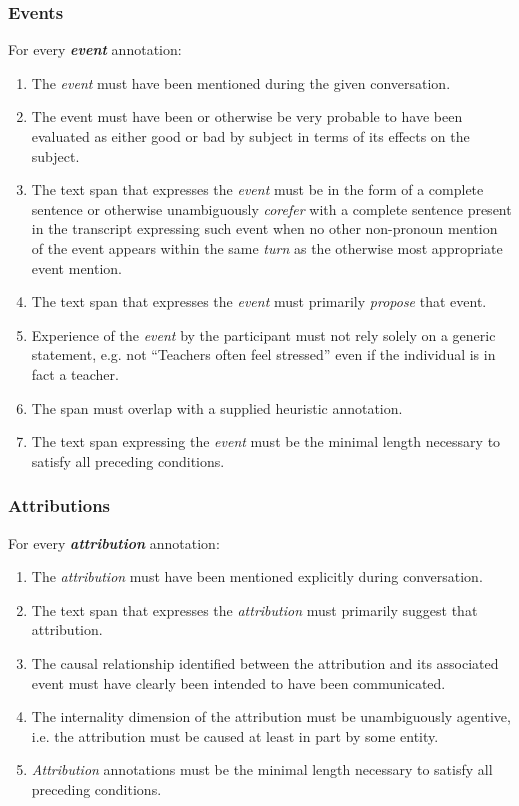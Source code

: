 \documentclass[a4paper,12pt]{article}
\begin{document}
    \subsubsection{Events}
    For every \textbf{\emph{event}} annotation:
        \begin{enumerate}
            \item The \emph{event} must have been mentioned during the given conversation.
            \item The event must have been or otherwise be very probable to have been evaluated as either good or bad by subject in terms of its effects on the subject.
            \item The text span that expresses the \emph{event} must be in the form of a complete sentence or otherwise unambiguously \emph{corefer} with a complete sentence present in the transcript expressing such event when no other non-pronoun mention of the event appears within the same \emph{turn} as the otherwise most appropriate event mention.
            \item The text span that expresses the \emph{event} must primarily \emph{propose} that event. %
            \item Experience of the \emph{event} by the participant must not rely solely on a generic statement,
                e.g. not ``Teachers often feel stressed'' even if the individual is in fact a teacher.
            \item The span must overlap with a supplied heuristic annotation.
            \item The text span expressing the \emph{event} must be the minimal length necessary to satisfy all preceding conditions.
        \end{enumerate}


    \subsubsection{Attributions}
    For every \textbf{\emph{attribution}} annotation:
        \begin{enumerate}
            \item The \emph{attribution} must have been mentioned explicitly during conversation.
            \item The text span that expresses the \emph{attribution} must primarily suggest that attribution. %
            \item The causal relationship identified between the attribution and its associated event must have clearly been intended to have been communicated.
            \item The internality dimension of the attribution must be unambiguously agentive, i.e. the attribution must be caused at least in part by some entity.
            \item \emph{Attribution} annotations must be the minimal length necessary to satisfy all preceding conditions.
        \end{enumerate}
\end{document}
